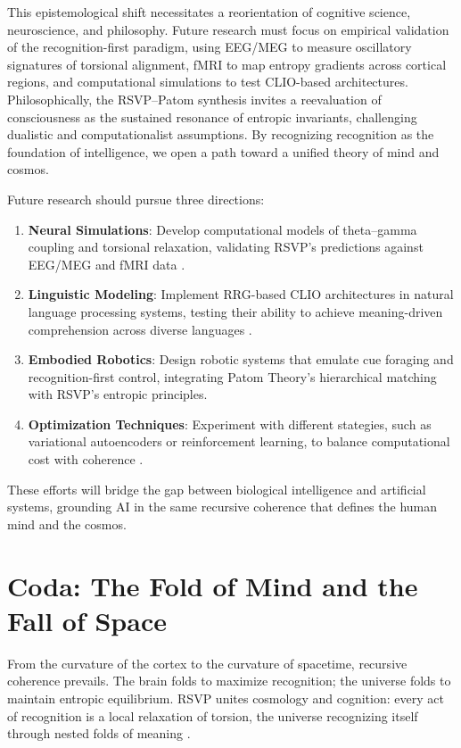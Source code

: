 \documentclass[11pt]{article}
\begin{document}
This epistemological shift necessitates a reorientation of cognitive science, neuroscience, and philosophy. Future research must focus on empirical validation of the recognition-first paradigm, using EEG/MEG to measure oscillatory signatures of torsional alignment, fMRI to map entropy gradients across cortical regions, and computational simulations to test CLIO-based architectures. Philosophically, the RSVP--Patom synthesis invites a reevaluation of consciousness as the sustained resonance of entropic invariants, challenging dualistic and computationalist assumptions. By recognizing recognition as the foundation of intelligence, we open a path toward a unified theory of mind and cosmos.

Future research should pursue three directions:
\begin{enumerate}
\item \textbf{Neural Simulations}: Develop computational models of theta--gamma coupling and torsional relaxation, validating RSVP’s predictions against EEG/MEG and fMRI data \citep{alivisatos2012brain}.
\item \textbf{Linguistic Modeling}: Implement RRG-based CLIO architectures in natural language processing systems, testing their ability to achieve meaning-driven comprehension across diverse languages \citep{vanvalin2001role, ball2017babitasks}.
\item \textbf{Embodied Robotics}: Design robotic systems that emulate cue foraging and recognition-first control, integrating Patom Theory’s hierarchical matching with RSVP’s entropic principles.
\item \textbf{Optimization Techniques}: Experiment with different stategies, such as variational autoencoders or reinforcement learning, to balance computational cost with coherence \citep{pinker2005computational}.
\end{enumerate}
These efforts will bridge the gap between biological intelligence and artificial systems, grounding AI in the same recursive coherence that defines the human mind and the cosmos.

\section*{Coda: The Fold of Mind and the Fall of Space}
From the curvature of the cortex to the curvature of spacetime, recursive coherence prevails. The brain folds to maximize recognition; the universe folds to maintain entropic equilibrium. RSVP unites cosmology and cognition: every act of recognition is a local relaxation of torsion, the universe recognizing itself through nested folds of meaning \citep{cheng2025clio}.
\end{document}
